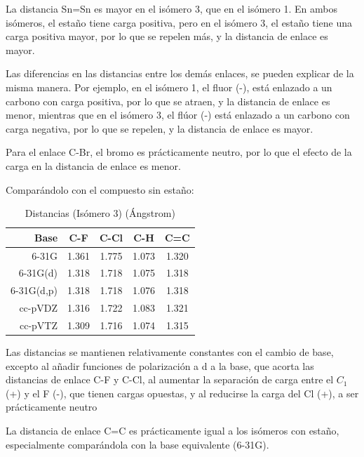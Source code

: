 \documentclass[12pt]{article}
\begin{document}
La distancia Sn=Sn es mayor en el isómero 3, que en el isómero 1. En ambos isómeros, el estaño tiene carga positiva, pero en el isómero 3, el estaño tiene una carga positiva mayor, por lo que se repelen más, y la distancia de enlace es mayor.

Las diferencias en las distancias entre los demás enlaces, se pueden explicar de la misma manera. Por ejemplo, en el isómero 1, el fluor (-), está enlazado a un carbono con carga positiva, por lo que se atraen, y la distancia de enlace es menor, mientras que en el isómero 3, el flúor (-) está enlazado a un carbono con carga negativa, por lo que se repelen, y la distancia de enlace es mayor.

Para el enlace C-Br, el bromo es prácticamente neutro, por lo que el efecto de la carga en la distancia de enlace es menor.

Comparándolo con el compuesto sin estaño:
\begin{table}[H]
\centering
    \begin{tabular}{rcccc}
        \hline
        Base & C-F & C-Cl & C-H & C=C \\
        \hline
        6-31G      & 1.361 & 1.775 & 1.073 & 1.320 \\
        6-31G(d)   & 1.318 & 1.718 & 1.075 & 1.318 \\
        6-31G(d,p) & 1.318 & 1.718 & 1.076 & 1.318 \\
        cc-pVDZ    & 1.316 & 1.722 & 1.083 & 1.321 \\
        cc-pVTZ    & 1.309 & 1.716 & 1.074 & 1.315 \\
        \hline
    \end{tabular}
    \caption{Distancias (Isómero 3) (Ángstrom)}
\end{table}

Las distancias se mantienen relativamente constantes con el cambio de base, excepto al añadir funciones de polarización a d a la base, que acorta las distancias de enlace C-F y C-Cl, al aumentar la separación de carga entre el $C_1$ (+) y el F (-), que tienen cargas opuestas, y al reducirse la carga del Cl (+), a ser prácticamente neutro

La distancia de enlace C=C es prácticamente igual a los isómeros con estaño, especialmente comparándola con la base equivalente (6-31G).




\newpage
\end{document}
